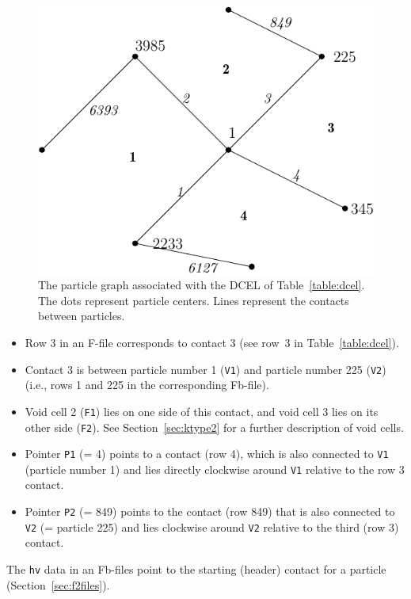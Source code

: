 \documentclass[letterpaper,11pt]{article}
\begin{document}
\begin{figure}
  \centering
  \includegraphics{Figures/dcel.pdf}
  \caption{The particle graph associated with the DCEL of Table~\ref{table:dcel}.
           The dots represent particle centers.  Lines represent the contacts between
           particles.}
           \label{fig:dcel}
\end{figure}
%
\begin{itemize}
\item
Row 3 in an F-file corresponds to contact 3
(see row~3 in Table~\ref{table:dcel}).
\item
Contact 3 is between particle number 1 (\texttt{V1})
and particle number 225 (\texttt{V2})
(i.e., rows 1 and 225 in the corresponding Fb-file).
\item
Void cell 2 (\texttt{F1}) lies on one side of this
contact, and void cell 3 lies on its other side (\texttt{F2}).
See Section~\ref{sec:ktype2} for a further description of void cells.
\item
Pointer \texttt{P1} (= 4) points to a contact (row 4),
which is also connected to \texttt{V1} (particle number 1)
and lies directly clockwise around \texttt{V1} relative to the 
row 3 contact.
\item
Pointer \texttt{P2} (= 849) points to the contact (row 849)
that is also connected to \texttt{V2} (= particle 225)
and lies clockwise around \texttt{V2} relative
to the third (row 3) contact.
\end{itemize}
The \texttt{hv} data in an Fb-files point to the starting
(header) contact for a
particle (Section~\ref{sec:f2files}).
\end{document}
